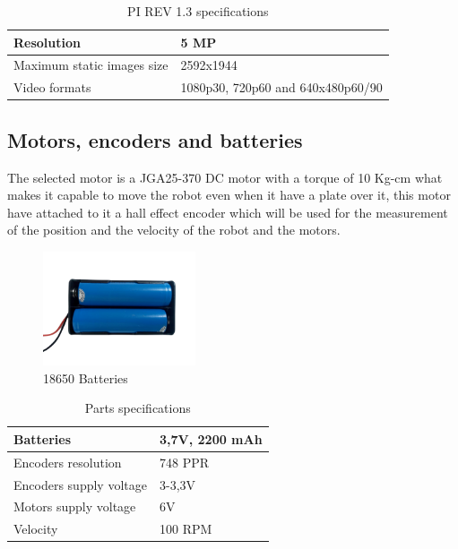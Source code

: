\begin{table}[H]
\caption{PI REV 1.3 specifications}
\begin{centering}
\begin{tabular}{>{\centering}p{7cm}>{\centering}p{4cm}}
\hline 
\raggedright{}Resolution & \raggedright{}5 MP\tabularnewline
\hline 
\raggedright{}Maximum static images size & \raggedright{}2592x1944\tabularnewline
\hline 
\raggedright{}Video formats & \raggedright{}1080p30, 720p60 and 640x480p60/90\tabularnewline
\hline 
\end{tabular}
\par\end{centering}
\end{table}

\subsection{Motors, encoders and batteries}

The selected motor is a JGA25-370 DC motor with a torque of 10 Kg-cm what makes it capable to move the robot even when it have a plate over it, this motor have attached to it a hall effect encoder which will be used for the measurement of the position and the velocity of the robot and the motors.  

\begin{figure}[H]
    \centering
 	\includegraphics[trim=0 0 0 0,clip,width=0.4\textwidth]{Figs/Batteries1.png}
    \caption{18650 Batteries}
    \label{fig:Batteries}
\end{figure}

\begin{table}[H]
\caption{Parts specifications}
\begin{centering}
\begin{tabular}{>{\centering}p{7cm}>{\centering}p{4cm}}
\hline 
\raggedright{}Batteries & \raggedright{}3,7V, 2200 mAh\tabularnewline
\hline 
\raggedright{}Encoders resolution& \raggedright{}748 PPR\tabularnewline
\hline 
\raggedright{}Encoders supply voltage & \raggedright{}3-3,3V\tabularnewline
\hline 
\raggedright{}Motors supply voltage & \raggedright{}6V\tabularnewline
\hline 
\raggedright{}Velocity & \raggedright{}100 RPM\tabularnewline
\hline 
\end{tabular}
\par\end{centering}
\end{table}

